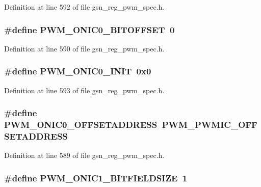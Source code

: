 Definition at line 592 of file gsn\_\-reg\_\-pwm\_\-spec.h.

\hypertarget{a00565_a928d555584e421cb9e6e88567673806d}{
\subsubsection[{PWM\_\-ONIC0\_\-BITOFFSET}]{\setlength{\rightskip}{0pt plus 5cm}\#define PWM\_\-ONIC0\_\-BITOFFSET~0}}
\label{a00565_a928d555584e421cb9e6e88567673806d}


Definition at line 590 of file gsn\_\-reg\_\-pwm\_\-spec.h.

\hypertarget{a00565_a6cd4e0b036ef62f52d2d5f102572c526}{
\subsubsection[{PWM\_\-ONIC0\_\-INIT}]{\setlength{\rightskip}{0pt plus 5cm}\#define PWM\_\-ONIC0\_\-INIT~0x0}}
\label{a00565_a6cd4e0b036ef62f52d2d5f102572c526}


Definition at line 593 of file gsn\_\-reg\_\-pwm\_\-spec.h.

\hypertarget{a00565_afc5297678ec187528a5d97caf97284c1}{
\subsubsection[{PWM\_\-ONIC0\_\-OFFSETADDRESS}]{\setlength{\rightskip}{0pt plus 5cm}\#define PWM\_\-ONIC0\_\-OFFSETADDRESS~PWM\_\-PWMIC\_\-OFFSETADDRESS}}
\label{a00565_afc5297678ec187528a5d97caf97284c1}


Definition at line 589 of file gsn\_\-reg\_\-pwm\_\-spec.h.

\hypertarget{a00565_a6406cc11fa48cff5633713551ecad887}{
\subsubsection[{PWM\_\-ONIC1\_\-BITFIELDSIZE}]{\setlength{\rightskip}{0pt plus 5cm}\#define PWM\_\-ONIC1\_\-BITFIELDSIZE~1}}
\label{a00565_a6406cc11fa48cff5633713551ecad887}


